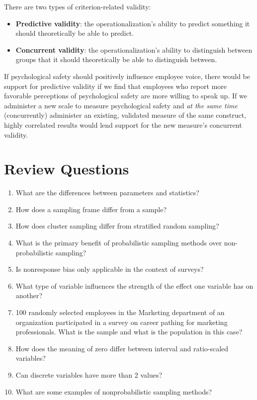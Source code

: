 \documentclass[]{book}
\providecommand{\tightlist}{%
  \setlength{\itemsep}{0pt}\setlength{\parskip}{0pt}}
\begin{document}
There are two types of criterion-related validity:

\begin{itemize}
\tightlist
\item
  \textbf{Predictive validity}: the operationalization's ability to predict something it should theoretically be able to predict.
\item
  \textbf{Concurrent validity}: the operationalization's ability to distinguish between groups that it should theoretically be able to distinguish between.
\end{itemize}

If psychological safety should positively influence employee voice, there would be support for predictive validity if we find that employees who report more favorable perceptions of psychological safety are more willing to speak up. If we administer a new scale to measure psychological safety and \emph{at the same time} (concurrently) administer an existing, validated measure of the same construct, highly correlated results would lend support for the new measure's concurrent validity.

\hypertarget{review-questions-1}{%
\section{Review Questions}\label{review-questions-1}}

\begin{enumerate}
\def\labelenumi{\arabic{enumi}.}
\item
  What are the differences between parameters and statistics?
\item
  How does a sampling frame differ from a sample?
\item
  How does cluster sampling differ from stratified random sampling?
\item
  What is the primary benefit of probabilistic sampling methods over non-probabilistic sampling?
\item
  Is nonresponse bias only applicable in the context of surveys?
\item
  What type of variable influences the strength of the effect one variable has on another?
\item
  100 randomly selected employees in the Marketing department of an organization participated in a survey on career pathing for marketing professionals. What is the sample and what is the population in this case?
\item
  How does the meaning of zero differ between interval and ratio-scaled variables?
\item
  Can discrete variables have more than 2 values?
\item
  What are some examples of nonprobabilistic sampling methods?
\end{enumerate}
\end{document}
